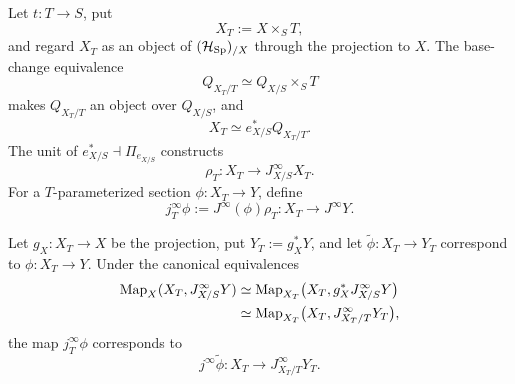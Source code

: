\begin{construction}
\label{con:parameterized-base-coaction}
Let \(t:T\to S\), put
\[
  X_T:=X\times_ST,
\]
and regard \(X_T\) as an object of \((\mathcal H_{\operatorname{Sp}})_{/X}\) through the projection to
\(X\). The base-change equivalence
\[
  Q_{X_T/T}\simeq Q_{X/S}\times_ST
\]
makes \(Q_{X_T/T}\) an object over \(Q_{X/S}\), and
\[
  X_T\simeq e_{X/S}^*Q_{X_T/T}.
\]
The unit of \(e_{X/S}^*\dashv\Pi_{e_{X/S}}\) constructs
\[
  \rho_T:
  X_T\longrightarrow J^\infty_{X/S}X_T.
\]
For a \(T\)-parameterized section \(\phi:X_T\to Y\), define
\[
  j_T^\infty\phi
  :=
  J^\infty(\phi)\rho_T:
  X_T\to J^\infty Y.
\]
\end{construction}

\begin{proposition}
\label{prop:parameterized-prolongation-basechange}
Let \(g_X:X_T\to X\) be the projection, put \(Y_T:=g_X^*Y\), and let
\(\widetilde\phi:X_T\to Y_T\) correspond to \(\phi:X_T\to Y\). Under the
canonical equivalences
\[
\begin{aligned}
  \operatorname{Map}_X(X_T,J^\infty_{X/S}Y)
  &\simeq
  \operatorname{Map}_{X_T}
  \bigl(X_T,g_X^*J^\infty_{X/S}Y\bigr)\\
  &\simeq
  \operatorname{Map}_{X_T}
  \bigl(X_T,J^\infty_{X_T/T}Y_T\bigr),
\end{aligned}
\]
the map \(j_T^\infty\phi\) corresponds to
\[
  j^\infty\widetilde\phi:
  X_T\to J^\infty_{X_T/T}Y_T.
\]
\end{proposition}

